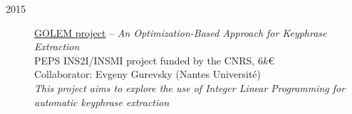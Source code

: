 \begin{description}
    \item[2015] \href{http://boudinfl.github.io/golem/}{GOLEM project} -- 
                \emph{An Optimization-Based Approach for Keyphrase Extraction} \\
                PEPS INS2I/INSMI project funded by the CNRS, 6$k$€ \\
                Collaborator: Evgeny Gurevsky (Nantes Université) \\[.1em]
                \emph{This project aims to explore the use of Integer Linear Programming for automatic keyphrase extraction}
                
\end{description}
